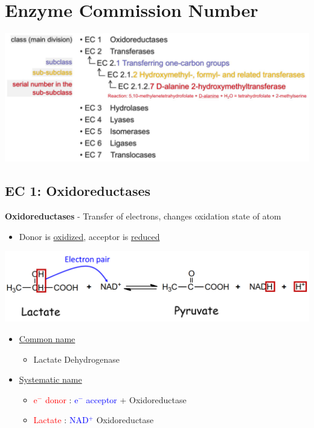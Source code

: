 \documentclass[10pt]{article}
\begin{document}
\section*{Enzyme Commission Number}
\begin{center}
    \includegraphics*[width=\textwidth]{L2_2.png} 
\end{center}

\subsection*{EC 1: Oxidoreductases}
\textbf{Oxidoreductases} - Transfer of electrons, changes oxidation state of atom
\begin{itemize}
    \item Donor is \underline{oxidized}, acceptor is \underline{reduced}
\end{itemize}
\begin{center}
    \includegraphics*[width=\textwidth]{L2_3.png} 
\end{center}
\begin{itemize}
    \item \underline{Common name}
    \begin{itemize}
        \item Lactate Dehydrogenase
    \end{itemize}
    \item \underline{Systematic name}
    \begin{itemize}
        \item \textcolor{red}{e$^-$ donor} : \textcolor{blue}{e$^-$ acceptor} + Oxidoreductase
        \item \textcolor{red}{Lactate} : \textcolor{blue}{NAD$^+$} Oxidoreductase
    \end{itemize}
\end{itemize}
\end{document}
